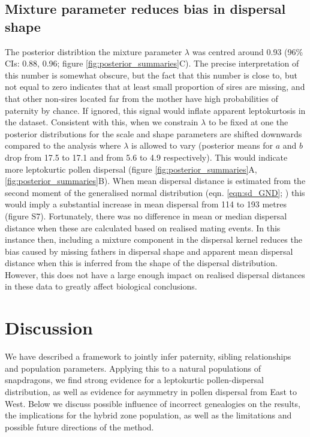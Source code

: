 \documentclass[10pt, a4paper, twocolumn]{article} %
\begin{document}
\subsection{Mixture parameter reduces bias in dispersal shape}

The posterior distribtion the mixture parameter $\lambda$ was centred around 0.93 (96\% CIs: 0.88, 0.96; figure \ref{fig:posterior_summaries}C).
The precise interpretation of this number is somewhat obscure, but the fact that this number is close to, but not equal to zero indicates that at least small proportion of sires are missing, and that other non-sires located far from the mother have high probabilities of paternity by chance.
If ignored, this signal would inflate apparent leptokurtosis in the dataset.
Consistent with this, when we constrain $\lambda$ to be fixed at one the posterior distributions for the scale and shape parameters are shifted downwards compared to the analysis where $\lambda$ is allowed to vary (posterior means for $a$ and $b$ drop from 17.5 to 17.1 and from 5.6 to 4.9 respectively).
This would indicate more leptokurtic pollen dispersal (figure \ref{fig:posterior_summaries}A, \ref{fig:posterior_summaries}B).
When mean dispersal distance is estimated from the second moment of the generalised normal distribution (eqn. \ref{eqn:sd_GND}; \cite{clark1998trees}) this would imply a substantial increase in mean dispersal from 114 to 193 metres (figure S7).
Fortunately, there was no difference in mean or median dispersal distance when these are calculated based on realised mating events.
In this instance then, including a mixture component in the dispersal kernel reduces the bias caused by missing fathers in dispersal shape and apparent mean dispersal distance when this is inferred from the shape of the dispersal distribution.
However, this does not have a large enough impact on realised dispersal distances in these data to greatly affect biological conclusions.

\section{Discussion}

We have described a framework to jointly infer paternity, sibling relationships and population parameters. 
Applying this to a natural populations of snapdragons, we find strong evidence for a leptokurtic pollen-dispersal distribution, as well as evidence for asymmetry in pollen dispersal from East to West.
Below we discuss possible influence of incorrect genealogies on the results, the implications for the hybrid zone population, as well as the limitations and possible future directions of the method.
\end{document}
